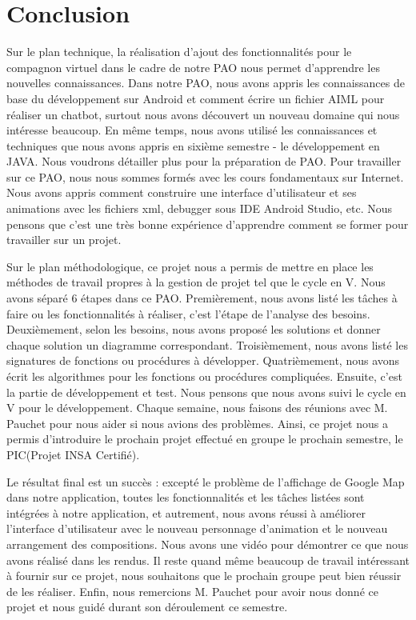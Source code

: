 \section*{Conclusion}

\indent Sur le plan technique, la réalisation d'ajout des fonctionnalités pour le compagnon virtuel dans le cadre de notre PAO nous permet d'apprendre les nouvelles connaissances. Dans notre PAO, nous avons appris les connaissances de base du développement sur Android et comment écrire un fichier AIML pour réaliser un chatbot, surtout nous avons découvert un nouveau domaine qui nous intéresse beaucoup. En même temps, nous avons utilisé les connaissances et techniques que nous avons appris en sixième semestre - le développement en JAVA. Nous voudrons détailler plus pour la préparation de PAO. Pour travailler sur ce PAO, nous nous sommes formés avec les cours fondamentaux sur Internet. Nous avons appris comment construire une interface d'utilisateur et ses animations avec les fichiers xml, debugger sous IDE Android Studio, etc. Nous pensons que c'est une très bonne expérience d'apprendre comment se former pour travailler sur un projet.

\indent Sur le plan méthodologique, ce projet nous a permis de mettre en place les méthodes de travail propres à la gestion de projet tel que le cycle en V. Nous avons séparé 6 étapes dans ce PAO. Premièrement, nous avons listé les tâches à faire ou les fonctionnalités à réaliser, c'est l'étape de l'analyse des besoins. Deuxièmement, selon les besoins, nous avons proposé les solutions et donner chaque solution un diagramme correspondant. Troisièmement, nous avons listé les signatures de fonctions ou procédures à développer. Quatrièmement, nous avons écrit les algorithmes pour les fonctions ou procédures compliquées. Ensuite, c'est la partie de développement et test. Nous pensons que nous avons suivi le cycle en V pour le développement. Chaque semaine, nous faisons des réunions avec M. Pauchet pour nous aider si nous avions des problèmes. Ainsi, ce projet nous a permis d'introduire le prochain projet effectué en groupe le prochain semestre, le PIC(Projet INSA Certifié).

\indent Le résultat final est un succès : excepté le problème de l'affichage de Google Map dans notre application, toutes les fonctionnalités et les tâches listées sont intégrées à notre application, et autrement, nous avons réussi à améliorer l'interface d'utilisateur avec le nouveau personnage d'animation et le nouveau arrangement des compositions. Nous avons une vidéo pour démontrer ce que nous avons réalisé dans les rendus. Il reste quand même beaucoup de travail intéressant à fournir sur ce projet, nous souhaitons que le prochain groupe peut bien réussir de les réaliser. Enfin, nous remercions M. Pauchet pour avoir nous donné ce projet et nous guidé durant son déroulement ce semestre.

\newpage
